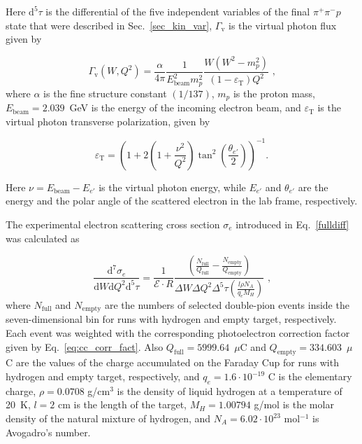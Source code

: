 \documentclass[prc,twocolumn,superscriptaddress,showpacs,amssymb,amsmath,amsfonts,aps,nofootinbib]{revtex4-1}
\begin{document}
Here $\textrm{d}^{5}\tau$ is the differential of the five independent variables of the final $\pi^{+}\pi^{-}p$ state that were described in Sec.~\ref{sec_kin_var}, $\Gamma_{\text{v}}$ is the 
virtual photon flux given by

\begin{equation}
\Gamma_{\text{v}}(W,Q^{2}) =
\frac{\alpha}{4\pi}\frac{1}{E_{\text{beam}}^{2}m_{p}^{2}}\frac{W(W^{2}-m_{p}^{2})}
{(1-\varepsilon_{\text{T}})Q^{2}} \textrm{ ,}
\label{flux}
\end{equation}
where $\alpha$ is the fine structure constant $\left(1/137\right)$, $m_{p}$ is the proton
mass, $E_{\text{beam}} = 2.039$~GeV is the energy of the incoming electron beam, and $\varepsilon_{\text{T}}$ is the virtual photon transverse polarization, given by

\begin{equation}
\varepsilon_{\text{T}} = \left( 1 + 2\left( 1 +
\frac{\nu^{2}}{Q^{2}} \right)
\tan^{2}\left(\frac{\theta_{e'}}{2}\right) \right)^{-1} \textrm{.}
\label{polarization}
\end{equation}

Here $\nu = E_\text{{beam}} - E_{e'}$ is the virtual photon energy, while $E_{e'}$ and
$\theta_{e'}$ are the energy and the polar angle of the scattered electron in the
lab frame, respectively. 


The experimental electron scattering cross section $\sigma_{e}$ introduced in Eq.~\eqref{fulldiff} was calculated as
  
 
\begin{equation}
\frac{\textrm{d}^{7}\sigma_{e}}{\textrm{d}W\textrm{d}Q^{2}\textrm{d}^{5}\tau} = \frac{1}{\mathcal{E} \cdot R} 
\frac{\left( \frac{N_{\text{full}}}{Q_{\text{full}}}-\frac{N_{\text{empty}}}{Q_{\text{empty}}} \right)}{
\Delta W \Delta Q^{2} \Delta^{5} \tau \left( \frac{l \rho N_{A}}{q_{e}M_{H}} \right)} \textrm{ ,}
\label{expcrossect}
\end{equation}
where $N_{\text{full}}$ and $N_{\text{empty}}$ are the numbers of selected double-pion events inside the
seven-dimensional bin for runs with hydrogen and
empty target, respectively. 
Each event was weighted with the corresponding photoelectron correction factor given by Eq.~\eqref{eq:cc_corr_fact}.
Also  $Q_{\text{full}}= 5999.64$~$\mu$C and $Q_{\text{empty}} = 334.603$~$\mu$C are the  values of the charge accumulated on the Faraday Cup for runs with hydrogen and empty target, respectively, and $q_{e} =1.6 \cdot 10^{-19}$ C is the elementary charge, $\rho = 0.0708$  g/cm$^{3}$ is the density of liquid hydrogen at a temperature of 20~K,
$l = 2$ cm is the length of the target, $M_{H} = 1.00794$ g/mol is the molar density of
the natural mixture of hydrogen, and  $N_{A} =6.02 \cdot 10^{23}$ mol$^{-1}$ is Avogadro's
number.
\end{document}
